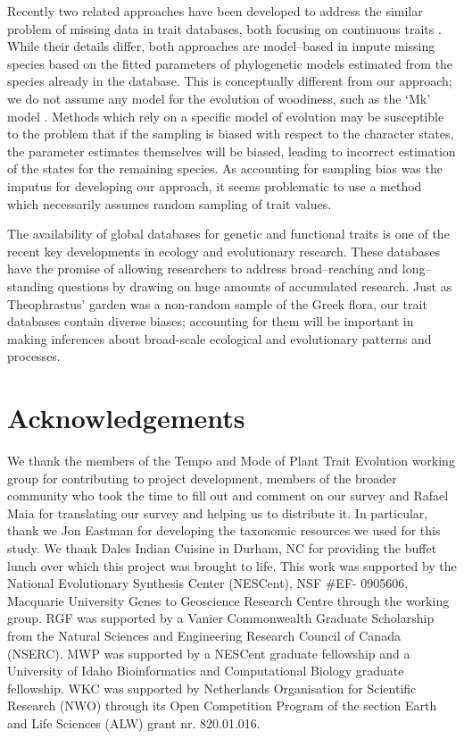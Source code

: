 \documentclass[a4paper,12pt]{article}
\begin{document}
Recently two related approaches have been developed to address the similar problem
of missing data in trait databases, both focusing on continuous traits \citep{Swenson2013, PEM}. 
While their details differ, both approaches are model--based in impute missing species
based on the fitted parameters of
phylogenetic models estimated from
the species already in the database. This is conceptually different from our approach;
we do not assume any model for the evolution of woodiness, such as the `Mk' model \citep{Pagel1994}.
Methods which rely on a specific model
of evolution may be susceptible to the problem that if the sampling is biased with respect
to the character states, the parameter estimates themselves will be biased, leading 
to incorrect estimation of the states for the remaining species. As accounting for sampling bias
was the imputus for developing our approach, it seems problematic to use
a method which necessarily assumes random sampling of trait values.

The availability of global databases for genetic and functional traits is one of the recent key developments in ecology and evolutionary research.  These databases have the promise of allowing researchers to address broad--reaching and long--standing questions by drawing on huge amounts of accumulated research.  
Just as Theophrastus' garden was a non-random sample of the Greek
flora, our trait databases contain diverse biases; accounting for
them will be important in making inferences about broad-scale
ecological and evolutionary patterns and processes.

\section{Acknowledgements}

We thank the members of the Tempo and Mode of Plant Trait
Evolution working group for contributing to project development,
members of the broader community who took the time to fill out and
comment on our survey and Rafael Maia for translating our survey and
helping us to distribute it.  In particular, thank we Jon Eastman for 
developing the taxonomic resources we used for this study.
%
We thank Dales Indian Cuisine in Durham, NC for providing the buffet
lunch over which this project was brought to life.
%
This work was supported by the National Evolutionary Synthesis Center
(NESCent), NSF \#EF- 0905606, Macquarie University Genes to Geoscience
Research Centre through the working group.
%
RGF was supported by a Vanier Commonwealth Graduate Scholarship from
the Natural Sciences and Engineering Research Council of Canada
(NSERC).
MWP was supported by a NESCent graduate fellowship and a 
University of Idaho Bioinformatics and Computational Biology graduate fellowship.
%
WKC was supported by Netherlands Organisation for
Scientific Research (NWO) through its Open Competition Program of the
section Earth and Life Sciences (ALW) grant nr. 820.01.016.
\end{document}
